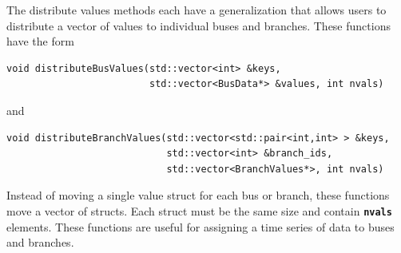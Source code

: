 The distribute values methods each have a generalization that allows users to distribute a vector of values to individual buses and branches. These functions have the form

{
\color{red}
\begin{Verbatim}[fontseries=b]
void distributeBusValues(std::vector<int> &keys,
                         std::vector<BusData*> &values, int nvals)
\end{Verbatim}
}

and

{
\color{red}
\begin{Verbatim}[fontseries=b]
void distributeBranchValues(std::vector<std::pair<int,int> > &keys,
                            std::vector<int> &branch_ids,
                            std::vector<BranchValues*>, int nvals)
\end{Verbatim}
}

Instead of moving a single value struct for each bus or branch, these functions
move a vector of structs. Each struct must be the same size and contain
\texttt{\textbf{nvals}} elements. These functions are useful for assigning a time series of data to buses and branches.
\newline
\hyperlink{topDoc}{\color{blue}{Top}}
